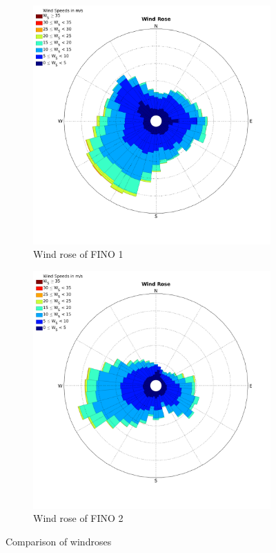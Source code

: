 \documentclass[10pt]{article}
\begin{document}
\begin{figure}[htb!]
\label{fig:WindRose1_valdidation}
\begin{subfigure}{0.5\textwidth}
  \centering
  \includegraphics[width=1\linewidth]{../figures/WindRose_Fino1.png}
  \caption{Wind rose of FINO 1}
\end{subfigure}
\begin{subfigure}{0.5\textwidth}
  \centering
  \includegraphics[width=1\linewidth]{../figures/WindRose_Fino2.png}
  \caption{Wind rose of FINO 2}
\end{subfigure}
\caption{Comparison of windroses}
  \label{fig:WindrosesVal}
\end{figure}
\end{document}
